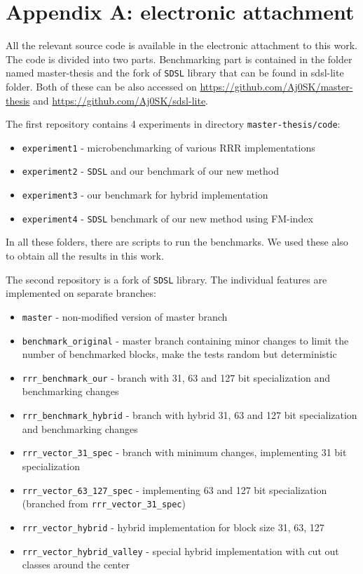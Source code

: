 \chapter*{Appendix A: electronic attachment}
\label{kap:kapAppendixA}

All the relevant source code is available in the electronic attachment to this work.
The code is divided into two parts. Benchmarking part is contained in the folder named
master-thesis and the fork of \texttt{SDSL} library that can be found in sdsl-lite folder.
Both of these can be also accessed on \url{https://github.com/Aj0SK/master-thesis} and
\url{https://github.com/Aj0SK/sdsl-lite}.

The first repository contains 4 experiments in directory \texttt{master-thesis/code}:
\begin{itemize}
    \item \texttt{experiment1} - microbenchmarking of various RRR implementations
    \item \texttt{experiment2} - \texttt{SDSL} and our benchmark of our new method
    \item \texttt{experiment3} - our benchmark for hybrid implementation
    \item \texttt{experiment4} - \texttt{SDSL} benchmark of our new method using FM-index
\end{itemize}
In all these folders, there are scripts to run the benchmarks. We used these also to obtain
all the results in this work. 

The second repository is a fork of \texttt{SDSL} library. The individual features are implemented
on separate branches:
\begin{itemize}
    \item \texttt{master} - non-modified version of master branch
    \item \texttt{benchmark\_original} - master branch containing minor changes
        to limit the number of benchmarked blocks, make the tests random but deterministic
    \item \texttt{rrr\_benchmark\_our} - branch with 31, 63 and 127 bit specialization and benchmarking changes
    \item \texttt{rrr\_benchmark\_hybrid} - branch with hybrid 31, 63 and 127 bit specialization and benchmarking changes
    \item \texttt{rrr\_vector\_31\_spec} - branch with minimum changes, implementing 31 bit specialization
    \item \texttt{rrr\_vector\_63\_127\_spec} - implementing 63 and 127 bit specialization (branched from \texttt{rrr\_vector\_31\_spec})
    \item \texttt{rrr\_vector\_hybrid} - hybrid implementation for block size 31, 63, 127
    \item \texttt{rrr\_vector\_hybrid\_valley} - special hybrid implementation with cut out classes around the center
\end{itemize}